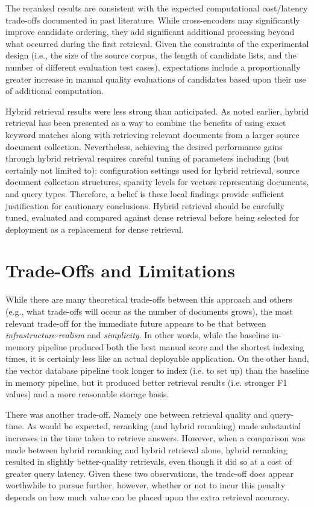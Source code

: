 The reranked results are consistent with the expected computational cost/latency trade-offs documented in past literature. While cross-encoders may significantly improve candidate ordering, they add significant additional processing beyond what occurred during the first retrieval. Given the constraints of the experimental design (i.e., the size of the source corpus, the length of candidate lists, and the number of different evaluation test cases), expectations include a proportionally greater increase in manual quality evaluations of candidates based upon their use of additional computation.

Hybrid retrieval results were less strong than anticipated. As noted earlier, hybrid retrieval has been presented as a way to combine the benefits of using exact keyword matches along with retrieving relevant documents from a larger source document collection. Nevertheless, achieving the desired performance gains through hybrid retrieval requires careful tuning of parameters including (but certainly not limited to): configuration settings used for hybrid retrieval, source document collection structures, sparsity levels for vectors representing documents, and query types. Therefore, a belief is these local findings provide sufficient justification for cautionary conclusions. Hybrid retrieval should be carefully tuned, evaluated and compared against dense retrieval before being selected for deployment as a replacement for dense retrieval.


\section{Trade-Offs and Limitations}
While there are many theoretical trade-offs between this approach and others (e.g., what trade-offs will occur as the number of documents grows), the most relevant trade-off for the immediate future appears to be that between \textit{infrastructure-realism} and \textit{simplicity}. In other words, while the baseline in-memory pipeline produced both the best manual score and the shortest indexing times, it is certainly less like an actual deployable application. On the other hand, the vector database pipeline took longer to index (i.e. to set up) than the baseline in memory pipeline, but it produced better retrieval results (i.e. stronger F1 values) and a more reasonable storage basis.

There was another trade-off. Namely one between retrieval quality and query-time. As would be expected, reranking (and hybrid reranking) made substantial increases in the time taken to retrieve answers. However, when a comparison was made between hybrid reranking and hybrid retrieval alone, hybrid reranking resulted in slightly better-quality retrievals, even though it did so at a cost of greater query latency. Given these two observations, the trade-off does appear worthwhile to pursue further, however, whether or not to incur this penalty depends on how much value can be placed upon the extra retrieval accuracy.

